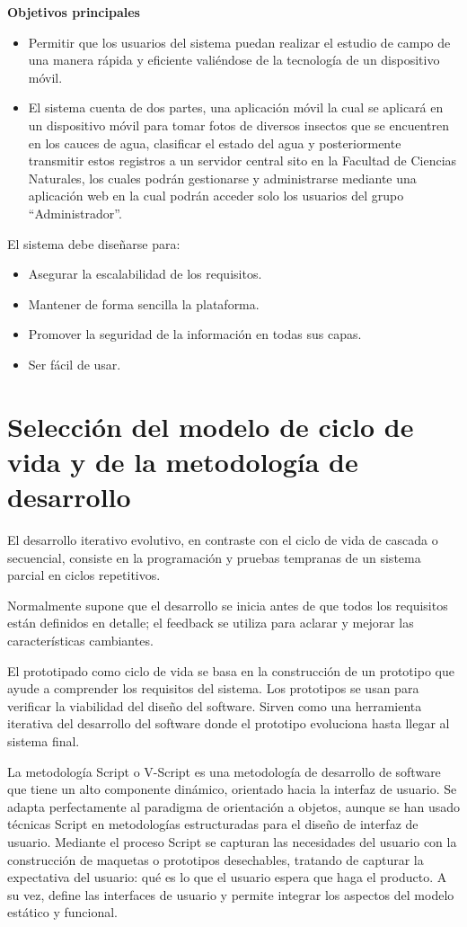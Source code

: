 \textbf{Objetivos principales} 

\begin{itemize}
    \item Permitir que los usuarios del sistema puedan realizar el estudio de campo de una manera rápida y eficiente valiéndose de la tecnología de un dispositivo móvil.
    \item El sistema cuenta de dos partes, una aplicación móvil la cual se aplicará en un dispositivo móvil para tomar fotos de diversos insectos que se encuentren en los cauces de agua, clasificar el estado del agua y posteriormente transmitir estos registros a un servidor central sito en la Facultad de Ciencias Naturales, los cuales podrán gestionarse y administrarse mediante una aplicación web en la cual podrán acceder solo los usuarios del grupo ``Administrador''.
\end{itemize}

El sistema debe diseñarse para:

\begin{itemize}
    \item Asegurar la escalabilidad de los requisitos.
    \item Mantener de forma sencilla la plataforma.
    \item Promover la seguridad de la información en todas sus capas.
    \item Ser fácil de usar.
\end{itemize}

\section{Selección del modelo de ciclo de vida y de la metodología de desarrollo}

El desarrollo iterativo evolutivo, en contraste con el ciclo de vida de cascada o secuencial, consiste en la programación y pruebas tempranas de un sistema parcial en ciclos repetitivos. 

Normalmente supone que el desarrollo se inicia antes de que todos los requisitos están definidos en detalle; el feedback se utiliza para aclarar y mejorar las características cambiantes.

El prototipado como ciclo de vida se basa en la construcción de un prototipo que ayude a comprender los requisitos del sistema. Los prototipos se usan para verificar la viabilidad del diseño del software. Sirven como una herramienta iterativa del desarrollo del software donde el prototipo evoluciona hasta llegar al sistema final. 

La metodología Script o V-Script es una metodología de desarrollo de software que tiene un alto componente dinámico, orientado hacia la interfaz de usuario. Se adapta perfectamente al paradigma de orientación a objetos, aunque se han usado técnicas Script en metodologías estructuradas para el diseño de interfaz de usuario.
Mediante el proceso Script se capturan las necesidades del usuario con la construcción de maquetas o prototipos desechables, tratando de capturar la expectativa del usuario: qué es lo que el usuario espera que haga el producto. A su vez, define las interfaces de usuario y permite integrar los aspectos del modelo estático y funcional.
